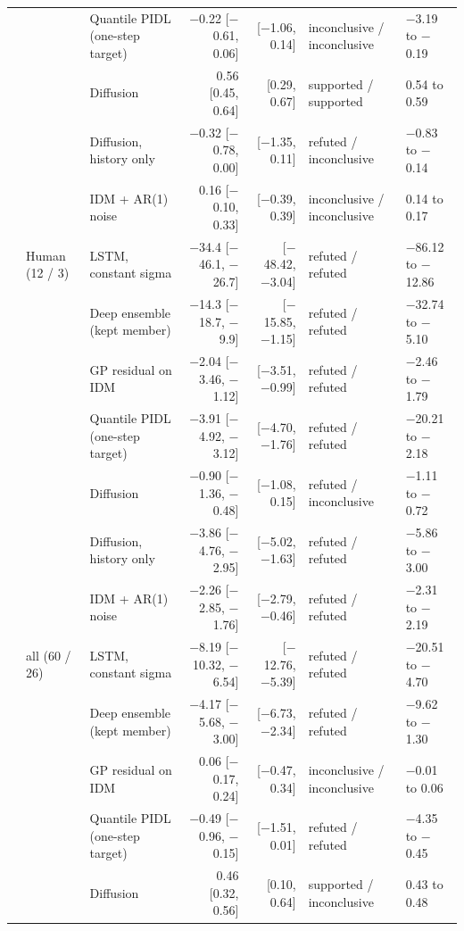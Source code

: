 \begin{longtable}{lllrrll}
 &  & Quantile PIDL (one-step target) & $-$0.22 [$-$0.61, 0.06] & [$-$1.06, 0.14] & inconclusive / inconclusive & $-$3.19 to $-$0.19 \\
 &  & Diffusion & 0.56 [0.45, 0.64] & [0.29, 0.67] & supported / supported & 0.54 to 0.59 \\
 &  & Diffusion, history only & $-$0.32 [$-$0.78, 0.00] & [$-$1.35, 0.11] & refuted / inconclusive & $-$0.83 to $-$0.14 \\
 &  & IDM + AR(1) noise & 0.16 [$-$0.10, 0.33] & [$-$0.39, 0.39] & inconclusive / inconclusive & 0.14 to 0.17 \\
\midrule
 & Human (12 / 3) & LSTM, constant sigma & $-$34.4 [$-$46.1, $-$26.7] & [$-$48.42, $-$3.04] & refuted / refuted & $-$86.12 to $-$12.86 \\
 &  & Deep ensemble (kept member) & $-$14.3 [$-$18.7, $-$9.9] & [$-$15.85, $-$1.15] & refuted / refuted & $-$32.74 to $-$5.10 \\
 &  & GP residual on IDM & $-$2.04 [$-$3.46, $-$1.12] & [$-$3.51, $-$0.99] & refuted / refuted & $-$2.46 to $-$1.79 \\
 &  & Quantile PIDL (one-step target) & $-$3.91 [$-$4.92, $-$3.12] & [$-$4.70, $-$1.76] & refuted / refuted & $-$20.21 to $-$2.18 \\
 &  & Diffusion & $-$0.90 [$-$1.36, $-$0.48] & [$-$1.08, 0.15] & refuted / inconclusive & $-$1.11 to $-$0.72 \\
 &  & Diffusion, history only & $-$3.86 [$-$4.76, $-$2.95] & [$-$5.02, $-$1.63] & refuted / refuted & $-$5.86 to $-$3.00 \\
 &  & IDM + AR(1) noise & $-$2.26 [$-$2.85, $-$1.76] & [$-$2.79, $-$0.46] & refuted / refuted & $-$2.31 to $-$2.19 \\
\midrule
 & all (60 / 26) & LSTM, constant sigma & $-$8.19 [$-$10.32, $-$6.54] & [$-$12.76, $-$5.39] & refuted / refuted & $-$20.51 to $-$4.70 \\
 &  & Deep ensemble (kept member) & $-$4.17 [$-$5.68, $-$3.00] & [$-$6.73, $-$2.34] & refuted / refuted & $-$9.62 to $-$1.30 \\
 &  & GP residual on IDM & 0.06 [$-$0.17, 0.24] & [$-$0.47, 0.34] & inconclusive / inconclusive & $-$0.01 to 0.06 \\
 &  & Quantile PIDL (one-step target) & $-$0.49 [$-$0.96, $-$0.15] & [$-$1.51, 0.01] & refuted / refuted & $-$4.35 to $-$0.45 \\
 &  & Diffusion & 0.46 [0.32, 0.56] & [0.10, 0.64] & supported / inconclusive & 0.43 to 0.48 \\

\end{longtable}
